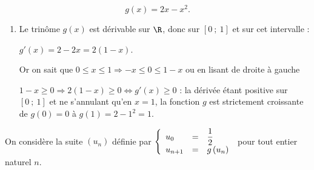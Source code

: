

\[g(x) = 2x - x^{2}.\]

\smallskip

\begin{enumerate}
\item %
Le trinôme $g(x)$ est dérivable sur $\R$, donc sur $[0~;~1]$ et sur cet intervalle :

$g'(x) = 2 - 2x = 2(1 - x)$.

Or on sait que $0\leqslant x \leqslant 1\Rightarrow - x \leqslant 0 \leqslant 1 - x$ ou en lisant de droite à gauche 

$1 - x \geqslant 0 \Rightarrow 2(1 - x) \geqslant 0 \iff g'(x) \geqslant 0$ : la dérivée étant positive sur $[0~;~1]$ et ne s'annulant qu'en $x = 1$, la fonction $g$ est strictement croissante de $g(0 ) = 0$ à $g(1) = 2 - 1^2 = 1$.
\end{enumerate}

On considère la suite $\left(u_{n}\right)$ définie par $\left\{\begin{array}{l c l}u_{0}&=&\dfrac{1}{2}\\ u_{n+1}&=&g\left(u_{n}\right)\end{array}\right.$ pour tout entier naturel $n$.

